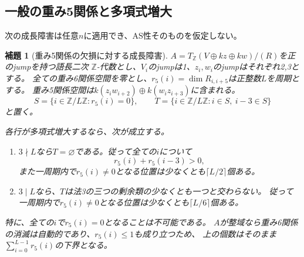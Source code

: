 \documentclass[11pt,a4paper]{ltjsarticle}
\newtheorem{lemma}[theorem]{補題}
\theoremstyle{definition}
\begin{document}
\subsection{一般の重み5関係と多項式増大}
次の成長障害は任意$n$に適用でき、AS性そのものを仮定しない。
\begin{lemma}[重み5関係の欠損に対する成長障害]
\label{genidx:lem:weight-five-growth}
$A=T_{\mathbb Z}(V\oplus kz\oplus kw)/(R)$を正のjumpを持つ語長二次
$\mathbb Z$-代数とし、$V_i$のjumpは1、$z_i,w_i$のjumpはそれぞれ2,3とする。
全ての重み6関係空間を零とし、$r_5(i)=\dim R_{i,i+5}$は正整数$L$を周期とする。
重み5関係空間は$k(z_iw_{i+2})\oplus k(w_iz_{i+3})$に含まれる。
\[
S=\{i\in\mathbb Z/L\mathbb Z:r_5(i)=0\},\qquad
T=\{i\in\mathbb Z/L\mathbb Z:i\in S,\ i-3\in S\}
\]
と置く。

各行が多項式増大するなら、次が成立する。
\begin{enumerate}
\item $3\nmid L$なら$T=\varnothing$である。従って全ての$i$について
\[
r_5(i)+r_5(i-3)>0,
\]
また一周期内で$r_5(i)\ne0$となる位置は少なくとも$\lceil L/2\rceil$個ある。
\item $3\mid L$なら、$T$は法3の三つの剰余類の少なくとも一つと交わらない。
従って一周期内で$r_5(i)\ne0$となる位置は少なくとも$\lceil L/6\rceil$個ある。
\end{enumerate}
特に、全ての$i$で$r_5(i)=0$となることは不可能である。
$A$が整域なら重み6関係の消滅は自動的であり、$r_5(i)\leq1$も成り立つため、
上の個数はそのまま$\sum_{i=0}^{L-1}r_5(i)$の下界となる。

\end{lemma}
\end{document}
